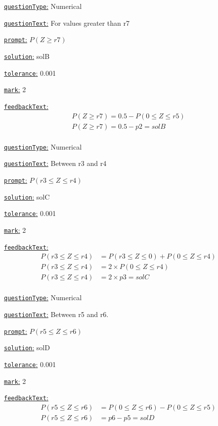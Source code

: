 \documentclass[preview]{standalone}
\newcommand \fieldname[1]{\underline{\texttt{#1}:}}
\begin{document}
\fieldname{questionType}
Numerical

\fieldname{questionText}
For values greater than {r7}

\fieldname{prompt}
$P(Z \ge {r7} )$

\fieldname{solution}
solB

\fieldname{tolerance}
0.001

\fieldname{mark}
2

\fieldname{feedbackText}
\[
\begin{aligned}
P(Z \ge {r7}) = 0.5 - P( 0 \le Z \le {r5})\\
P(Z \ge {r7}) = 0.5 - {p2} = {solB} \\
\end{aligned}
\]

\fieldname{questionType}
Numerical

\fieldname{questionText}
Between {r3} and {r4}

\fieldname{prompt}
$P({r3} \le Z \le {r4} )$

\fieldname{solution}
solC

\fieldname{tolerance}
0.001

\fieldname{mark}
2

\fieldname{feedbackText}
\[
\begin{aligned}
P({r3} \le Z \le {r4}) & = P({r3} \le Z \le 0 ) + P( 0 \le Z \le {r4})\\
P({r3} \le Z \le {r4}) & = 2 \times P( 0 \le Z \le {r4})\\
P({r3} \le Z \le {r4}) & = 2 \times {p3} = {solC}\\
\end{aligned}
\]

\fieldname{questionType}
Numerical

\fieldname{questionText}
Between {r5} and {r6}.

\fieldname{prompt}
$P({r5} \le Z \le {r6})$

\fieldname{solution}
solD

\fieldname{tolerance}
0.001

\fieldname{mark}
2

\fieldname{feedbackText}
\[
\begin{aligned}
P({r5} \le Z \le {r6}) & = P( 0 \le Z \le {r6}) - P( 0 \le Z \le {r5})\\
P({r5} \le Z \le {r6}) & = {p6} - {p5} = {solD}\\
\end{aligned}
\]

\end{document}
